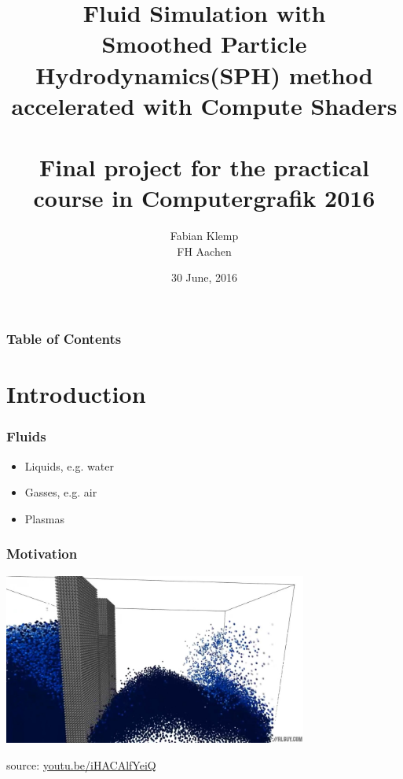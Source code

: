 \documentclass{beamer}
\title{
    Fluid Simulation with\\
    Smoothed Particle Hydrodynamics(SPH) method\\
    accelerated with Compute Shaders\\
    ${\quad}$\\
    \small{Final project for the practical course in Computergrafik 2016}
}
\author{Fabian Klemp\\
    \small{FH Aachen}\\
}
\date{30 June, 2016}
\begin{document}
{
\begin{frame}[noframenumbering]
    \maketitle
\end{frame}
}
\begin{frame}
    \frametitle{Table of Contents}
    \tableofcontents
\end{frame}

\section{Introduction}
\begin{frame}
    \frametitle{Fluids}
    \begin{itemize}
        \item Liquids, e.g. water
        \item Gasses, e.g. air
        \item Plasmas
    \end{itemize}
\end{frame}
\begin{frame}
    \frametitle{Motivation}
    \begin{center}
        \includegraphics[width=10cm]{introduction.jpg}
    \end{center}
    \begin{flushright}
        source: \href{https://youtu.be/iHACAlfYeiQ}{youtu.be/iHACAlfYeiQ}
    \end{flushright}
\end{frame}
\end{document}

